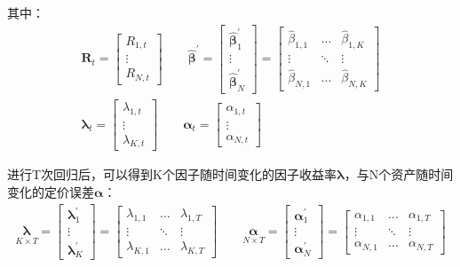 \documentclass[11pt]{article}
\begin{document}
其中：
\begin{gather*}
    \bm{R}_t = \begin{bmatrix}R_{1,t} \\ \vdots \\ R_{N,t}\end{bmatrix}
    \qquad 
    \hat{\bm{\beta}}^{'} = 
    \begin{bmatrix} \bm{\hat{\beta}}_{1}^{'} \\ \vdots \\ \bm{\hat{\beta}}_{N}^{'} \end{bmatrix} =
    \begin{bmatrix} \hat{\beta}_{1,1} & \dots & \hat{\beta}_{1,K} \\ \vdots & \ddots & \vdots \\ \hat{\beta}_{N,1} & \dots & \hat{\beta}_{N,K} \end{bmatrix}
    \\
    \bm{\lambda}_t = \begin{bmatrix}\lambda_{1,t} \\ \vdots \\ \lambda_{K,t} \end{bmatrix}
    \qquad
    \bm{\alpha}_t = \begin{bmatrix}\alpha_{1,t} \\ \vdots \\ \alpha_{N,t} \end{bmatrix}
\end{gather*}

进行T次回归后，可以得到K个因子随时间变化的因子收益率$\bm{\lambda}$，与N个资产随时间变化的定价误差$\bm{\alpha}$：
\begin{gather*}
    \underset{K \times T}{\bm{\lambda}} = \begin{bmatrix} \bm{\lambda}_{1}^{'} \\ \vdots \\ \bm{\lambda}_{K}^{'} \end{bmatrix} = 
    \begin{bmatrix} \lambda_{1,1} & \dots & \lambda_{1,T} \\ \vdots & \ddots & \vdots \\ \lambda_{K,1} & \dots & \lambda_{K,T} \end{bmatrix}
    \qquad
    \underset{N \times T}{\bm{\alpha}} = \begin{bmatrix} \bm{\alpha}_{1}^{'} \\ \vdots \\ \bm{\alpha}_{N}^{'} \end{bmatrix} =
    \begin{bmatrix} \alpha_{1,1} & \dots & \alpha_{1,T} \\ \vdots & \ddots & \vdots \\ \alpha_{N,1} & \dots & \alpha_{N,T} \end{bmatrix}
\end{gather*}
\end{document}
